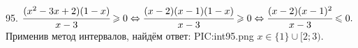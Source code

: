 95. $\cfrac{(x^2-3x+2)(1-x)}{x-3}\geqslant0\Leftrightarrow\cfrac{(x-2)(x-1)(1-x)}{x-3}\geqslant0\Leftrightarrow\cfrac{(x-2)(x-1)^2}{x-3}\leqslant0.$ Применив метод интервалов, найдём ответ:
{{PIC:int95.png}}
$x\in\{1\}\cup[2;3).$\\
